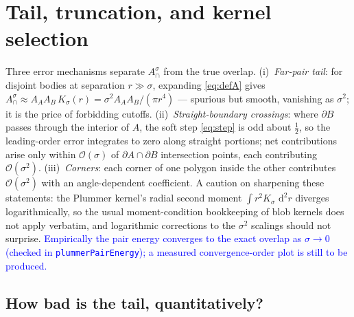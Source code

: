 \documentclass[11pt]{article}
\newcommand{\aside}[1]{\textcolor{blue}{#1}}
\newcommand{\dd}{\,\mathrm{d}}
\newcommand{\Acap}{A^{\sigma}_{\cap}}
\begin{document}
\section{Tail, truncation, and kernel selection}
\label{sec:tail}

Three error mechanisms separate $\Acap$ from the true overlap.  (i)~\emph{Far-pair
tail}: for disjoint bodies at separation $r\gg\sigma$, expanding \eqref{eq:defA}
gives $\Acap\approx A_A A_B\,K_\sigma(r)=\sigma^2 A_A A_B/(\pi r^4)$ --- spurious but
smooth, vanishing as $\sigma^2$; it is the price of forbidding cutoffs.
(ii)~\emph{Straight-boundary crossings}: where $\partial B$ passes through the
interior of $A$, the soft step \eqref{eq:step} is odd about $\tfrac12$, so the
leading-order error integrates to zero along straight portions; net contributions
arise only within $\mathcal O(\sigma)$ of $\partial A\cap\partial B$ intersection
points, each contributing $\mathcal O(\sigma^2)$.  (iii)~\emph{Corners}: each corner
of one polygon inside the other contributes $\mathcal O(\sigma^2)$ with an
angle-dependent coefficient.  A caution on sharpening these statements: the Plummer
kernel's radial second moment $\int r^2K_\sigma\,\dd^2r$ diverges logarithmically, so
the usual moment-condition bookkeeping of blob kernels \cite{BealeMajda1985} does not
apply verbatim, and logarithmic corrections to the $\sigma^2$ scalings should not
surprise.  \aside{Empirically the pair energy converges to the exact overlap as
$\sigma\to0$ (checked in \texttt{plummerPairEnergy}); a measured convergence-order
plot is still to be produced.}

\subsection{How bad is the tail, quantitatively?}
\label{sec:tailsize}
\end{document}
